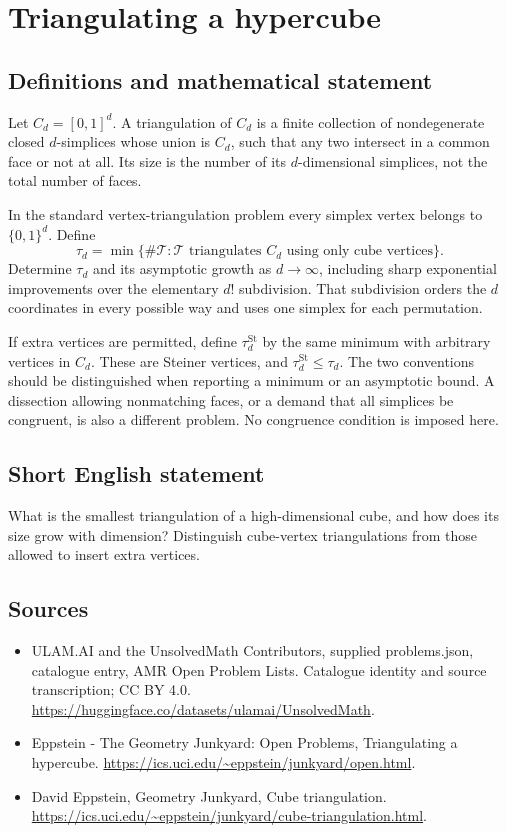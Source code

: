 \documentclass[11pt,a4paper]{article}
\begin{document}
\section*{Triangulating a hypercube}\label{statement}

\subsection{Definitions and mathematical statement}
Let $C_d=[0,1]^d$. A triangulation of $C_d$ is a finite collection of
nondegenerate closed $d$-simplices whose union is $C_d$, such that any two
intersect in a common face or not at all. Its size is the number of its
$d$-dimensional simplices, not the total number of faces.

In the standard vertex-triangulation problem every simplex vertex belongs
to $\{0,1\}^d$. Define
\[
 \tau_d=\min\{\#\mathcal T:\mathcal T\text{ triangulates }C_d
                 \text{ using only cube vertices}\}.
\]
Determine $\tau_d$ and its asymptotic growth as $d\to\infty$, including
sharp exponential improvements over the elementary $d!$ subdivision.
That subdivision orders the $d$ coordinates in every possible way and
uses one simplex for each permutation.

If extra vertices are permitted, define $\tau_d^{\mathrm{St}}$ by the same
minimum with arbitrary vertices in $C_d$. These are Steiner vertices, and
$\tau_d^{\mathrm{St}}\le\tau_d$. The two conventions should be distinguished
when reporting a minimum or an asymptotic bound. A dissection allowing
nonmatching faces, or a demand that all simplices be congruent, is also a
different problem. No congruence condition is imposed here.
\subsection{Short English statement}
What is the smallest triangulation of a high-dimensional cube, and how
does its size grow with dimension? Distinguish cube-vertex triangulations
from those allowed to insert extra vertices.
\subsection{Sources}
\begin{itemize}
\item[S1] ULAM.AI and the UnsolvedMath Contributors, supplied problems.json, catalogue entry, AMR Open Problem Lists. Catalogue identity and source transcription; CC BY 4.0.
\url{https://huggingface.co/datasets/ulamai/UnsolvedMath}.
\item[S2] Eppstein - The Geometry Junkyard: Open Problems, Triangulating a hypercube. 
\url{https://ics.uci.edu/~eppstein/junkyard/open.html}.
\item[S3] David Eppstein, Geometry Junkyard, Cube triangulation.
\url{https://ics.uci.edu/~eppstein/junkyard/cube-triangulation.html}.
\end{itemize}
\end{document}
